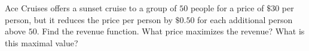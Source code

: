 \documentclass[../mathNotesPreamble]{subfiles}
\begin{document}
  \begin{ex*}
    Ace Cruises offers a sunset cruise to a group of $50$ people for a price of $\$30$ per person, but it reduces the price per person by $\$0.50$ for each additional person above $50$. Find the revenue function. What price maximizes the revenue? What is this maximal value?
  \end{ex*}

  \pagebreak
\end{document}
